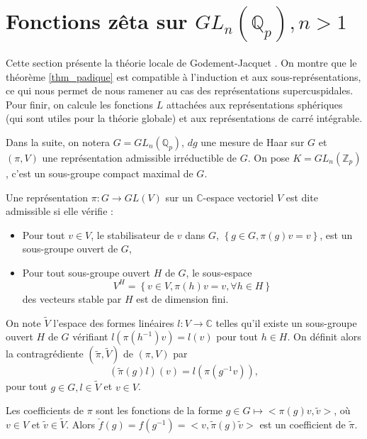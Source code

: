 \section{Fonctions zêta sur $GL_n(\mathbb{Q}_p), n > 1$}

\label{gln}
Cette section présente la théorie locale de Godement-Jacquet \cite{godement-jacquet}. On montre que le théorème \ref{thm_padique} est compatible à l'induction et aux sous-représentations, ce qui nous permet de nous ramener au cas des représentations supercuspidales. Pour finir, on calcule les fonctions $L$ attachées aux représentations sphériques (qui sont utiles pour la théorie globale) et aux représentations de carré intégrable.

Dans la suite, on notera $G = GL_n(\mathbb{Q}_p)$, $dg$ une mesure de Haar sur $G$ et $(\pi, V)$ une représentation admissible irréductible de $G$. On pose $K=GL_n(\mathbb{Z}_p)$, c'est un sous-groupe compact maximal de $G$.

\begin{definition}
Une représentation $\pi : G \rightarrow GL(V)$ sur un $\mathbb{C}$-espace vectoriel $V$ est dite admissible si elle vérifie :
\begin{itemize}
\item Pour tout $v \in V$, le stabilisateur de $v$ dans $G$, $\left\lbrace g \in G, \pi(g)v = v \right\rbrace$, est un sous-groupe ouvert de $G$,
\item Pour tout sous-groupe ouvert $H$ de $G$, le sous-espace
\begin{equation*}
V^H=\left\lbrace v \in V, \pi(h)v = v, \forall h \in H \right\rbrace
\end{equation*}
des vecteurs stable par $H$ est de dimension fini.
\end{itemize}
\end{definition}

\begin{definition}
On note $\tilde{V}$ l'espace des formes linéaires $l : V \rightarrow \mathbb{C}$ telles qu'il existe un sous-groupe ouvert $H$ de $G$ vérifiant $l(\pi(h^{-1})v)=l(v)$ pour tout $h \in H$. On définit alors la contragrédiente $(\tilde{\pi}, \tilde{V})$ de $(\pi, V)$ par
\begin{equation}
(\tilde{\pi}(g)l)(v) = l(\pi(g^{-1}v)),
\end{equation}
pour tout $g \in G, l \in \tilde{V}$ et $v \in V$.
\end{definition}

Les coefficients de $\pi$ sont les fonctions de la forme $g \in G \mapsto <\pi(g)v, \tilde{v}>$, où $v \in V$ et $\tilde{v} \in \tilde{V}$. Alors $\check{f}(g)=f(g^{-1})=<v, \tilde{\pi}(g)\tilde{v}>$ est un coefficient de $\tilde{\pi}$.

